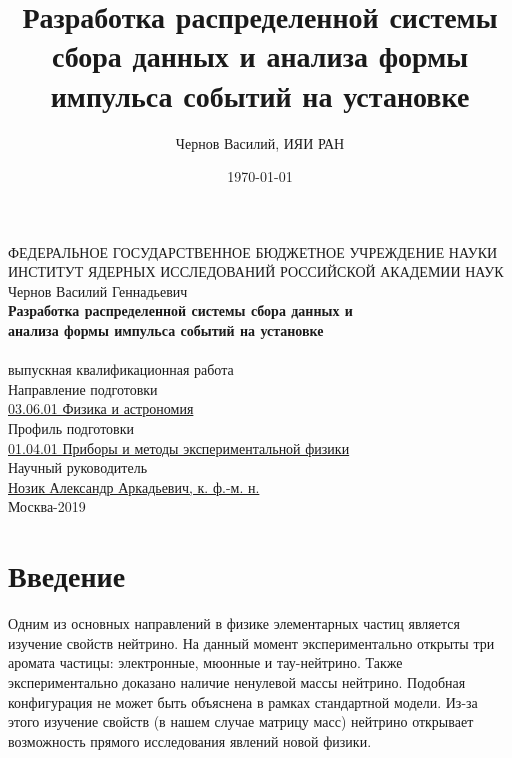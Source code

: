 \documentclass[a4paper,14pt]{extreport}
\title{Разработка распределенной системы сбора данных и анализа формы импульса событий на установке \textquote{Троицк ню-масс}}
\author{Чернов Василий, ИЯИ РАН}
\date{\today}
\begin{document}
\thispagestyle{empty}
\begin{center}
\hfill \break
\normalsize{ФЕДЕРАЛЬНОЕ  ГОСУДАРСТВЕННОЕ БЮДЖЕТНОЕ УЧРЕЖДЕНИЕ НАУКИ}\\
\normalsize{ИНСТИТУТ ЯДЕРНЫХ ИССЛЕДОВАНИЙ РОССИЙСКОЙ АКАДЕМИИ НАУК} \\
\hfill \break
\hfill \break
\hfill \break
\normalsize{Чернов Василий Геннадьевич}\\
\hfill \break
\hfill \break
\normalsize{
    \textbf{Разработка распределенной системы сбора данных и \\анализа формы импульса событий на установке \\ } \\
    }
\hfill \break
\normalsize{выпускная квалификационная работа} \\
\hfill \break
\hfill \break
Направление подготовки \\
\underline{03.06.01 Физика и астрономия} \\
\hfill \break
\hfill \break
Профиль подготовки \\
\underline{01.04.01 Приборы и методы экспериментальной физики} \\
\hfill \break
\hfill \break
Научный руководитель\\
\underline{Нозик Александр Аркадьевич, к. ф.-м. н.} \\
\hfill \break
\hfill \break
\hfill \break
\hfill \break
\hfill \break
\normalsize{ Москва-2019 }\\
\end{center}

\newpage

\setcounter{tocdepth}{3}
\tableofcontents
\newpage
\listoftodos
{}

\chapter*{Введение}

Одним из основных направлений в физике элементарных частиц является изучение свойств нейтрино. На данный момент экспериментально открыты три аромата частицы: электронные, мюонные и тау-нейтрино. Также экспериментально доказано наличие ненулевой массы нейтрино. Подобная конфигурация не может быть объяснена в рамках стандартной модели. Из-за этого изучение свойств (в нашем случае матрицу масс) нейтрино открывает возможность прямого исследования явлений новой физики.
\end{document}
